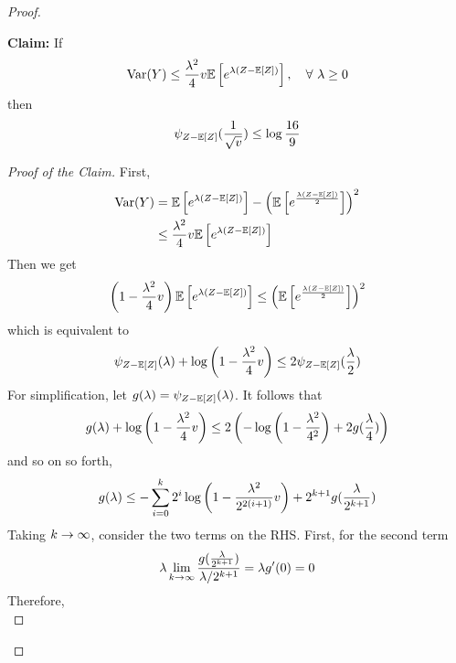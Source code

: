 \begin{enumerate}[label=\arabic{*}.]
\begin{proof}
\begin{enumerate}[label=\Roman*.]
		    \noindent\textbf{Claim:} If
		    \begin{equation*}
		        \operatorname{Var}(Y)\leq \frac{\lambda^2}{4} v \mathbb{E}\left[ e^{\lambda(Z - \mathbb{E}[Z])}\right],\quad \forall~\lambda \geq 0
		    \end{equation*}
		    then
		    \begin{equation*}
		        \psi_{Z - \mathbb{E}[Z]}(\frac{1}{\sqrt{v}}) \leq \log \frac{16}{9}
		    \end{equation*}
		    \begin{proof}[Proof of the Claim]
		        First,
		        \begin{equation*}
			        \begin{aligned}
			        	\operatorname{Var}(Y) &= \mathbb{E}\left[ e^{\lambda(Z - \mathbb{E}[Z])}\right] - \left(\mathbb{E}\left[e^{\frac{\lambda(Z - \mathbb{E}[Z])}{2}}\right]\right)^2 \\
			        	&\leq \frac{\lambda^2}{4} v \mathbb{E}\left[ e^{\lambda(Z - \mathbb{E}[Z])}\right]
			        \end{aligned}
			    \end{equation*}
			    Then we get
			    \begin{equation*}
			        \left(1- \frac{\lambda^2}{4} v\right)\mathbb{E}\left[ e^{\lambda(Z - \mathbb{E}[Z])}\right] \leq \left(\mathbb{E}\left[e^{\frac{\lambda(Z - \mathbb{E}[Z])}{2}}\right]\right)^2
			    \end{equation*}
			    which is equivalent to
			    \begin{equation*}
			        \psi_{Z-\mathbb{E}[Z]}(\lambda) + \log\left(1- \frac{\lambda^2}{4} v\right) \leq 2\psi_{Z-\mathbb{E}[Z]}(\frac{\lambda}{2})
			    \end{equation*}
			    For simplification, let $g(\lambda) = \psi_{Z-\mathbb{E}[Z]}(\lambda)$. It follows that
			    \begin{equation*}
			        g(\lambda) + \log\left(1- \frac{\lambda^2}{4} v\right) \leq 2\left(-\log\left(1-\frac{\lambda^2}{4^2}\right) + 2g(\frac{\lambda}{4})\right)
			    \end{equation*}
			    and so on so forth,
			    \begin{equation*}
			         g(\lambda) \leq -\sum_{i=0}^k2^i\log \left(1-\frac{\lambda^2}{2^{2(i+1)}}v\right) + 2^{k+1}g(\frac{\lambda}{2^{k+1}})
			    \end{equation*}
			    Taking $k \rightarrow \infty$, consider the two terms on the RHS. First, for the second term
			    \begin{equation*}
			        \lambda \lim_{k \rightarrow \infty} \frac{g(\frac{\lambda}{2^{k+1}})}{\lambda / 2^{k+1}} = \lambda g^\prime(0) = 0
			    \end{equation*}
			    Therefore,
			    \begin{equation*}

\end{equation*}
\end{proof}
\end{enumerate}
\end{proof}
\end{enumerate}
